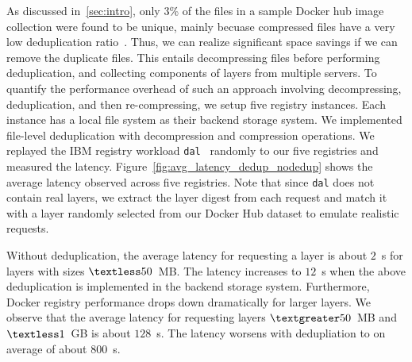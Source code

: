 As discussed in~\cref{sec:intro}, only $3$\% of the files in a sample Docker hub image collection were found to be unique, mainly becuase 
 compressed files have a very low deduplication ratio~\cite{meister2012study}.
Thus, 
we can realize significant space savings if we can remove the 
duplicate files. This entails decompressing files before performing deduplication, and collecting components of layers from multiple servers.
%
To quantify the performance overhead of such an approach involving decompressing, deduplication, and then re-compressing,
we setup five registry instances. Each instance has a local file system as their backend storage system. We
implemented file-level deduplication with decompression and compression operations.
We replayed the IBM registry workload \texttt{dal}~\cite{dockerworkload} 
randomly to our five registries and measured the latency. 
%
Figure~\ref{fig:avg_latency_dedup_nodedup} shows the average latency observed 
across five registries.
Note that since 
\texttt{dal} does not contain real layers,
we extract the layer digest from each request and match it with a layer randomly selected from our Docker Hub dataset to emulate realistic requests.

Without deduplication,
the average latency for requesting a layer is about $2$~s for layers with sizes $\textless50$~MB.
The latency increases to $12$~s when the above deduplication is implemented in the backend storage system.
Furthermore, Docker registry performance drops down dramatically for larger layers.
We observe that the average latency for requesting layers $\textgreater50$~MB and $\textless1$~GB
is about $128$~s. The latency worsens with dedupliation to on average of about $800$~s.


